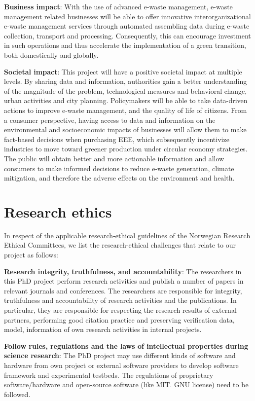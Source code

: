 \documentclass{article}
\numberwithin{equation}{section}
\begin{document}
\textbf{Business impact}: With the use of advanced e-waste management,  e-waste management related businesses will be able to offer innovative interorganizational e-waste management services through automated assembling data during e-waste collection, transport and processing. Consequently, this can encourage investment in such operations and thus accelerate the implementation of a green transition, both domestically and globally.

\textbf{Societal impact}: This project will have a positive societal impact at multiple levels. By sharing data and information, authorities gain a better understanding of the magnitude of the problem, technological measures and behavioral change, urban activities and city planning. Policymakers will be able to take data-driven actions to improve e-waste management, and the quality of life of citizens. From a consumer perspective, having access to data and information on the environmental and socioeconomic impacts of businesses will allow them to make fact-based decisions when purchasing EEE, which subsequently incentivize industries to move toward greener production under circular economy strategies. The public will obtain better and more actionable information and allow consumers to make informed decisions to reduce e-waste generation, climate mitigation, and therefore the adverse effects on the environment and health.

\section{Research ethics}
In respect of the applicable research-ethical guidelines of the Norwegian Research Ethical Committees, we list the research-ethical challenges that relate to our project as follows:

\textbf{Research integrity, truthfulness, and accountability}: The researchers in this PhD project perform research activities and publish a number of papers in relevant journals and conferences. The researchers are responsible for integrity, truthfulness and accountability of research activities and the publications. In particular, they are responsible for respecting the research results of external partners, performing good citation practice and preserving verification data, model, information of own research activities in internal projects.

\textbf{Follow rules, regulations and the laws of intellectual properties during science research}: The PhD project may use different kinds of software and hardware from own project or external software providers to develop software framework and experimental testbeds. The regulations of proprietary software/hardware and open-source software (like MIT. GNU license) need to be followed.
\end{document}
